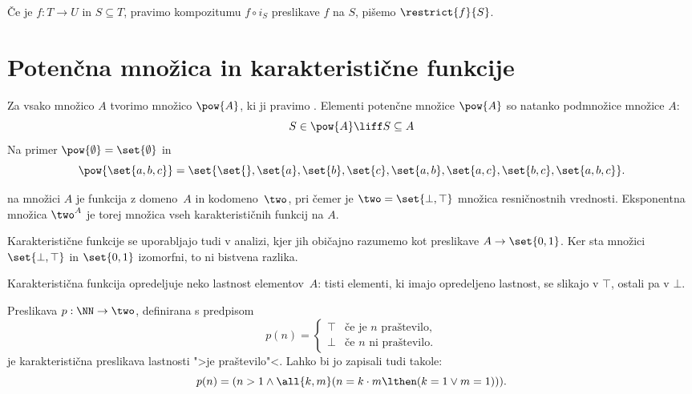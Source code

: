 Če je $f : T \to U$ in $S \subseteq T$, pravimo kompozitumu $f \circ i_S$  preslikave $f$ na $S$, pišemo $\restrict{f}{S}$.


\section{Potenčna množica in karakteristične funkcije}

Za vsako množico $A$ tvorimo množico $\pow{A}$, ki ji pravimo .
Elementi potenčne množice $\pow{A}$ so natanko podmnožice množice $A$:
%
\begin{equation*}
    S \in \pow{A} \liff S \subseteq A
\end{equation*}
%
Na primer $\pow{\emptyset} = \set{\emptyset}$ in
%
\begin{equation*}
  \pow{\set{a,b,c}} = \set{\set{}, \set{a}, \set{b}, \set{c}, \set{a,b}, \set{a,c}, \set{b,c}, \set{a,b,c}}.
\end{equation*}


 na množici $A$ je funkcija z domeno~$A$ in kodomeno~$\two$, pri čemer je $\two = \set{\bot, \top}$ množica resničnostnih vrednosti.
%
Eksponentna množica $\two^A$ je torej množica vseh karakterističnih funkcij na $A$.

\begin{opomba}
  Karakteristične funkcije se uporabljajo tudi v analizi, kjer jih
  običajno razumemo kot preslikave $A \to \set{0,1}$. Ker sta množici $\set{\bot,\top}$ in $\set{0,1}$ izomorfni, to ni bistvena razlika.
\end{opomba}

Karakteristična funkcija opredeljuje neko lastnost elementov~$A$: tisti elementi, ki imajo opredeljeno lastnost, se
slikajo v $\top$, ostali pa v $\bot$.

\begin{zgled}
  Preslikava $p : \NN \to \two$, definirana s predpisom
  \begin{equation*}
    p(n) = 
    \begin{cases}
      \top & \text{če je $n$ praštevilo}, \\
      \bot & \text{če $n$ ni praštevilo}.
    \end{cases}
  \end{equation*}
  je karakteristična preslikava lastnosti ">je praštevilo"<. Lahko bi jo zapisali tudi takole:
  \begin{equation*}
    p(n) = (n > 1 \land \all{k, m} (n = k \cdot m \lthen (k = 1 \lor m = 1))).
  \end{equation*}
\end{zgled}


